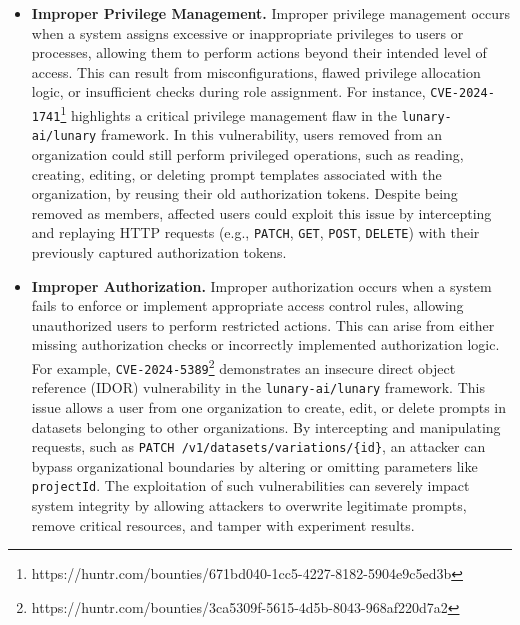 \begin{itemize}[leftmargin=10pt]  
    \item \textbf{Improper Privilege Management.} Improper privilege management occurs when a system assigns excessive or inappropriate privileges to users or processes, allowing them to perform actions beyond their intended level of access. This can result from misconfigurations, flawed privilege allocation logic, or insufficient checks during role assignment. 
    For instance, \texttt{CVE-2024-1741}\footnote{https://huntr.com/bounties/671bd040-1cc5-4227-8182-5904e9c5ed3b} highlights a critical privilege management flaw in the \texttt{lunary-ai/lunary} framework. In this vulnerability, users removed from an organization could still perform privileged operations, such as reading, creating, editing, or deleting prompt templates associated with the organization, by reusing their old authorization tokens. Despite being removed as members, affected users could exploit this issue by intercepting and replaying HTTP requests (e.g., \texttt{PATCH}, \texttt{GET}, \texttt{POST}, \texttt{DELETE}) with their previously captured authorization tokens.  
    
    \item \textbf{Improper Authorization.} Improper authorization occurs when a system fails to enforce or implement appropriate access control rules, allowing unauthorized users to perform restricted actions. This can arise from either missing authorization checks or incorrectly implemented authorization logic. For example, \texttt{CVE-2024-5389}\footnote{https://huntr.com/bounties/3ca5309f-5615-4d5b-8043-968af220d7a2} demonstrates an insecure direct object reference (IDOR) vulnerability in the \texttt{lunary-ai/lunary} framework. This issue allows a user from one organization to create, edit, or delete prompts in datasets belonging to other organizations. By intercepting and manipulating requests, such as \texttt{PATCH /v1/datasets/variations/\{id\}}, an attacker can bypass organizational boundaries by altering or omitting parameters like \texttt{projectId}.
    The exploitation of such vulnerabilities can severely impact system integrity by allowing attackers to overwrite legitimate prompts, remove critical resources, and tamper with experiment results. 


\end{itemize}
